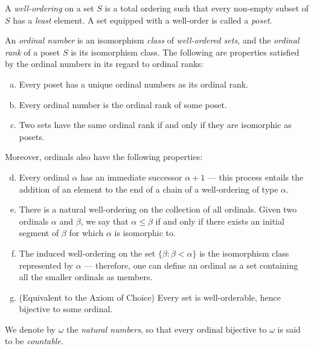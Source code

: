 \begin{definition}
\label{def:well-ordering}
A \emph{well-ordering} on a set \(S\) is a total ordering such that every
non-empty subset of \(S\) has a \emph{least} element. A set equipped with a
well-order is called a \emph{poset}.
\end{definition}

\begin{definition}[Ordinal]
\label{def:ordinal}
An \emph{ordinal number} is an isomorphism \emph{class} of \emph{well-ordered
  sets}, and the \emph{ordinal rank} of a poset \(S\) is its isomorphism
class. The following are properties satisfied by the ordinal numbers in its
regard to ordinal ranks:
\begin{enumerate}[(a)]\setlength\itemsep{0em}
\item Every poset has a unique ordinal numbers as its ordinal rank.

\item Every ordinal number is the ordinal rank of some poset.

\item Two sets have the same ordinal rank if and only if they are isomorphic as
  posets.
\end{enumerate}
Moreover, ordinals also have the following properties:
\begin{enumerate}[(a)]\setcounter{enumi}{3}\setlength\itemsep{0em}
\item Every ordinal \(\alpha\) has an immediate successor \(\alpha + 1\) ---
  this process entails the addition of an element to the end of a chain of a
  well-ordering of type \(\alpha\).

\item There is a natural well-ordering on the collection of all ordinals. Given
  two ordinals \(\alpha\) and \(\beta\), we say that \(\alpha \leq \beta\) if
  and only if there exists an initial segment of \(\beta\) for which \(\alpha\)
  is isomorphic to.

\item The induced well-ordering on the set \(\{\beta \colon \beta < \alpha\}\)
  is the isomorphism class represented by \(\alpha\) --- therefore, one can
  define an ordinal as a set containing all the smaller ordinals as members.

\item (Equivalent to the Axiom of Choice) Every set is well-orderable, hence
  bijective to some ordinal.
\end{enumerate}

We denote by \(\omega\) the \emph{natural numbers}, so that every ordinal
bijective to \(\omega\) is said to be \emph{countable}.
\end{definition}

